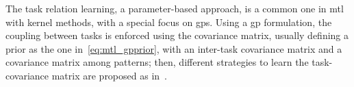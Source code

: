 


    The task relation learning, a parameter-based approach, is a common one in \acrshort{mtl} with kernel methods, with a special focus on \acrshort{gps}. Using a \acrshort{gp} formulation, the coupling between tasks is enforced using the covariance matrix, usually defining a prior as the one in~\eqref{eq:mtl_gpprior}, with an inter-task covariance matrix and a covariance matrix among patterns;
    then, different strategies to learn the task-covariance matrix are proposed as in~\cite{LawrenceP04, BonillaCW07}. 



